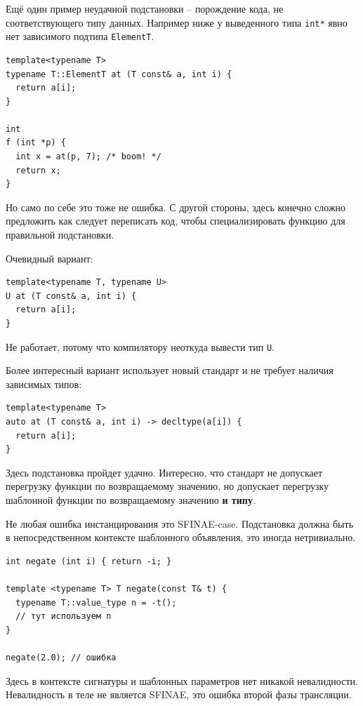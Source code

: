\documentclass[a4paper,12pt,oneside]{article}
\begin{document}
Ещё один пример неудачной подстановки -- порождение кода, не соответствующего типу данных. Например ниже у выведенного типа \lstinline!int*! явно нет зависимого подтипа \lstinline!ElementT!.

\begin{lstlisting}
template<typename T>
typename T::ElementT at (T const& a, int i) {
  return a[i];
}

int
f (int *p) {
  int x = at(p, 7); /* boom! */
  return x;
}
\end{lstlisting}

Но само по себе это тоже не ошибка. С другой стороны, здесь конечно сложно предложить как следует переписать код, чтобы специализировать функцию для правильной подстановки. 

Очевидный вариант:

\begin{lstlisting}
template<typename T, typename U>
U at (T const& a, int i) {
  return a[i];
}
\end{lstlisting}

Не работает, потому что компилятору неоткуда вывести тип \lstinline!U!.

Более интересный вариант использует новый стандарт и не требует наличия зависимых типов:

\begin{lstlisting}
template<typename T>
auto at (T const& a, int i) -> decltype(a[i]) {
  return a[i];
}
\end{lstlisting}

Здесь подстановка пройдет удачно. Интересно, что стандарт не допускает перегрузку функции по возвращаемому значению, но допускает перегрузку шаблонной функции по возвращаемому значению \textbf{и типу}.

Не любая ошибка инстанцирования это SFINAE-case. Подстановка должна быть в непосредственном контексте шаблонного объявления, это иногда нетривиально.

\begin{lstlisting}
int negate (int i) { return -i; }

template <typename T> T negate(const T& t) {
  typename T::value_type n = -t();
  // тут используем n
} 

negate(2.0); // ошибка
\end{lstlisting}

Здесь в контексте сигнатуры и шаблонных параметров нет никакой невалидности. Невалидность в теле не является SFINAE, это ошибка второй фазы трансляции.
\end{document}
